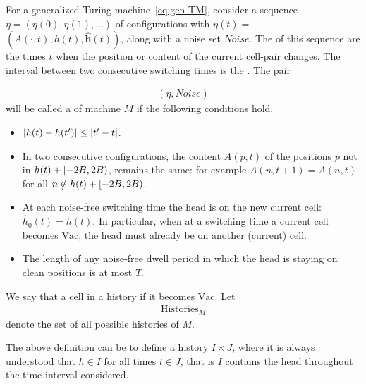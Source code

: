\documentclass[11pt]{memoir}
\theoremstyle{definition} %
\renewcommand{\le}{\leq}
\renewcommand{\vek}[1]{\mathbf{#1}}
\def\B{B}
\newcommand{\Vacant}{\mathrm{Vac}}
\newcommand{\h}{h}
\newcommand{\hc}{\hat h}
\newcommand{\vhc}{\vek{\hat h}}
\newcommand{\Noise}{\mathit{Noise}}
\newcommand{\Tu}{T}
\newcommand{\Histories}{\mathrm{Histories}}
\begin{document}
\begin{definition}[History]\label{def:history}
  \begin{sloppyenv}
    For a generalized Turing machine~\eqref{eq:gen-TM}, 
consider a sequence \( \eta = (\eta(0), \eta(1), \dots) \) of configurations with
\( \eta(t) = \) \( (A(\cdot, t), \h(t), \vhc(t)) \), along with a noise set \( \Noise \).
The  of this sequence are the times \( t \) when 
the position or content of the current cell-pair changes.
The interval between two consecutive switching times is the .
The pair
      \end{sloppyenv}
    \begin{align*}
       (\eta,\Noise)
    \end{align*}
    will be called a  of machine \( M \) if the following conditions hold.
        \begin{itemize}
            \item \( \abs{\h(t) - \h(t')} \le \abs{t' - t} \).

            \item In two consecutive configurations, the content \( A(p,t) \) of the positions \( p \)
              not in \( \h(t) + \lint{-2\B}{2\B} \), remains the same: for example
                  \( A(n,t+1) = A(n,t) \) for all \( n \notin \h(t) + \lint{-2\B}{2\B} \).
            \item At each noise-free switching time the head is on the new current cell:
\( \hc_{0}(t)=\h(t) \).
In particular, when at a switching time a current cell becomes
\( \Vacant \), the head must already be on another (current) cell.

            \item The length of any noise-free 
dwell period in which the head is staying on clean positions is at most \( \Tu \).

        \end{itemize}
We say that a cell  in a history if it becomes \( \Vacant \).
    Let
        \begin{align*}
            \Histories_{M}
        \end{align*}
    denote the set of all possible histories of \( M \).

The above definition can be  to define a history
 \( I\times J \), 
where it is always understood that \( \h\in I \) for all times \( t\in J \),
that is \( I \) contains the head throughout the time interval considered.
\end{definition}
\end{document}
